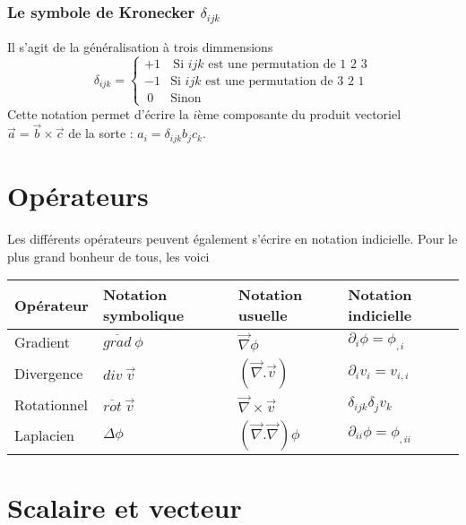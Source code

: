         \subsubsection{Le symbole de Kronecker $\delta_{ijk}$}
        Il s'agit de la généralisation à trois dimmensions
        \begin{equation}
        \delta_{ijk} = \left\{\begin{array}{ll}
         +1&\ \text{Si $ijk$ est une permutation de 1 2 3}  \\
         -1&  \text{Si $ijk$ est une permutation de 3 2 1}\\
         \ 0& \text{Sinon}
        \end{array}\right.
        \end{equation}
        Cette notation permet d'écrire la $i$ème composante du produit vectoriel $\vec{a}=\vec{b}\times
        \vec{c}$ de la sorte : $a_i = \delta_{ijk}b_jc_k$.
        
        
        
        
        
        
\section{Opérateurs}
    Les différents opérateurs peuvent également s'écrire en notation indicielle. Pour le plus grand 
    bonheur de tous, les voici
    
    \begin{center}
    \begin{tabularx}{10cm}{|X|X|X|X|}
        \hline 
        Opérateur & Notation symbolique& Notation usuelle & Notation indicielle \tabularnewline 
        \hline 
        Gradient & $\overline{grad}\ \phi$ & $\vec{\nabla}\phi$ & $\partial_i \phi = \phi_{,i}$\tabularnewline 
        \hline 
        Divergence & $div\ \vec{v}$ & $(\vec{\nabla}.\vec{v})$ & $\partial_i v_i = v_{i,i}$\tabularnewline
        \hline
        Rotationnel & $\overline{rot}\ \vec{v}$ & $\vec{\nabla}\times \vec{v}$ & $\delta_{ijk}\delta_j v_k$\tabularnewline
        \hline
        Laplacien & $\Delta \phi$ & $(\vec{\nabla}.\vec{\nabla})\phi$ & $\partial_{ii} \phi 
        = \phi_{,ii}$\tabularnewline
        \hline
        \end{tabularx}
    \label{tab:comparaison}
    \end{center}
    
\section{Scalaire et vecteur}

